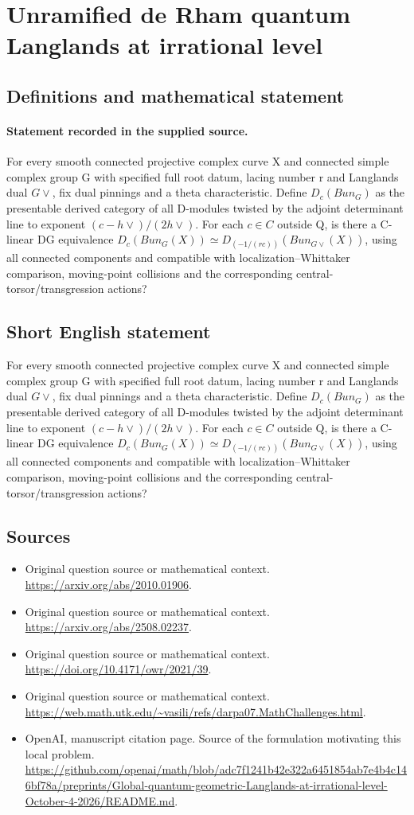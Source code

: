 \documentclass[11pt]{article}
\begin{document}
\section*{Unramified de Rham quantum Langlands at irrational level}\label{statement}
\subsection{Definitions and mathematical statement}
\paragraph{Statement recorded in the supplied source.}
For every smooth connected projective complex curve X and connected simple complex group G with specified full root datum, lacing number r and Langlands dual $G\vee $, fix dual pinnings and a theta characteristic. Define $D_c(Bun_G)$ as the presentable derived category of all D-modules twisted by the adjoint determinant line to exponent $(c-h\vee )/(2h\vee )$. For each $c\in C$ outside Q, is there a C-linear DG equivalence $D_c(Bun_G(X))\simeq D_(-1/(rc))(Bun_{G\vee }(X))$, using all connected components and compatible with localization–Whittaker comparison, moving-point collisions and the corresponding central-torsor/transgression actions?
\subsection{Short English statement}
For every smooth connected projective complex curve X and connected simple complex group G with specified full root datum, lacing number r and Langlands dual $G\vee $, fix dual pinnings and a theta characteristic. Define $D_c(Bun_G)$ as the presentable derived category of all D-modules twisted by the adjoint determinant line to exponent $(c-h\vee )/(2h\vee )$. For each $c\in C$ outside Q, is there a C-linear DG equivalence $D_c(Bun_G(X))\simeq D_(-1/(rc))(Bun_{G\vee }(X))$, using all connected components and compatible with localization–Whittaker comparison, moving-point collisions and the corresponding central-torsor/transgression actions?
\subsection{Sources}
\begin{itemize}
\item[S1] Original question source or mathematical context.
\url{https://arxiv.org/abs/2010.01906}.
\item[S2] Original question source or mathematical context.
\url{https://arxiv.org/abs/2508.02237}.
\item[S3] Original question source or mathematical context.
\url{https://doi.org/10.4171/owr/2021/39}.
\item[S4] Original question source or mathematical context.
\url{https://web.math.utk.edu/~vasili/refs/darpa07.MathChallenges.html}.
\item[S5] OpenAI, manuscript citation page. Source of the formulation motivating this local problem.
\url{https://github.com/openai/math/blob/adc7f1241b42e322a6451854ab7e4b4c146bf78a/preprints/Global-quantum-geometric-Langlands-at-irrational-level-October-4-2026/README.md}.
\end{itemize}
\end{document}
